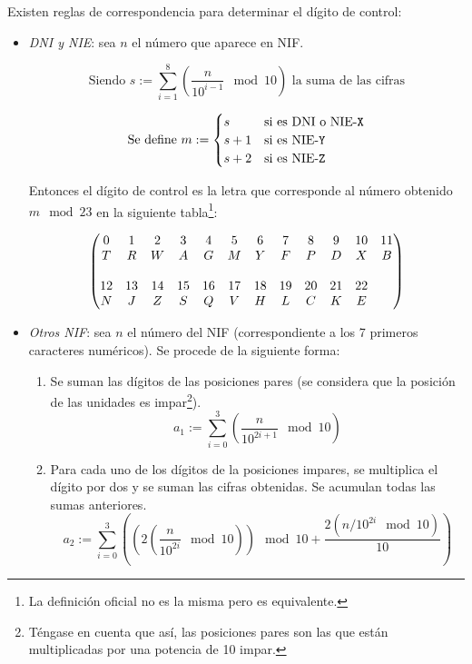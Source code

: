 	Existen reglas de correspondencia para determinar el dígito de control:
\begin{itemize}
	\item {\itshape DNI y NIE}: sea $n$ el número que aparece en NIF.

		\begin{equation*}
			\text{Siendo } s := \sum_{i=1}^8 \left( \frac{n}{10^{i-1}} \mod 10 \right) \text{ la suma de las cifras}
		\end{equation*}

		\begin{equation*}
			\text{Se define } m := 
			\begin{cases}
				s & \text{si es DNI o NIE-{\texttt X}}\\
				s + 1 & \text{si es NIE-{\texttt Y}}\\
				s + 2 & \text{si es NIE-{\texttt Z}}\\
			\end{cases}
		\end{equation*}

		Entonces el dígito de control es la letra que corresponde al número obtenido $m \mod 23$ en la siguiente tabla\footnote{La definición oficial no es la misma pero es equivalente.}: 

		{\small
		\begin{equation*}
			\setcounter{MaxMatrixCols}{12}
			\begin{pmatrix}
				0 & 1 & 2 & 3 & 4 & 5 & 6 & 7 & 8 & 9 & 10 & 11\\
				T & R & W & A & G & M & Y & F & P & D & X  & B  \\
				\\
				12 & 13 & 14 & 15 & 16 & 17 & 18 & 19 & 20 & 21 & 22 &\\
				N  & J  & Z  & S  & Q  & V  & H  & L  & C  & K  & E &\\ 
			\end{pmatrix}
		\end{equation*}
		}

	\item {\itshape Otros NIF}: sea $n$ el número del NIF (correspondiente a los 7 primeros caracteres numéricos). Se procede de la siguiente forma:	
		\begin{enumerate}
			\item Se suman las dígitos de las posiciones pares (se considera que la posición de las unidades es impar\footnote{Téngase en cuenta que así, las posiciones pares son las que están multiplicadas por una potencia de 10 impar.}).
				\begin{equation*}
					a_1 := \sum_{i=0}^3 \left( \frac{n}{10^{2i + 1}} \mod 10 \right)
				\end{equation*}
			\item Para cada uno de los dígitos de la posiciones impares, se multiplica el dígito por dos y se suman las cifras obtenidas. Se acumulan todas las sumas anteriores.
				\begin{equation*}
					a_2 := \sum_{i=0}^3 \left( \left( 2 \left( \frac{n}{10^{2i}} \mod 10\right) \right) \mod 10 + \frac{ 2 \left( n / 10^{2i} \mod 10 \right)}{10} \right)
				\end{equation*}


\end{enumerate}
\end{itemize}
